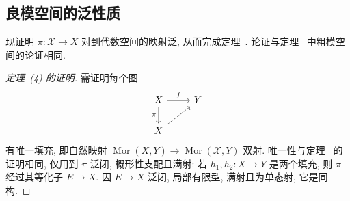 \subsection{良模空间的泛性质}\label{src:7.5.6-subsection}
现证明 $\pi:\mathcal X\to X$ 对到代数空间的映射泛, 从而完成定理~. 论证与定理~ 中粗模空间的论证相同.
\begin{proof}[定理~(4) 的证明]
需证明每个图
\begin{align}\label{src:7.5.29}
\begin{tikzcd}[ampersand replacement=\&]
\mathcal X\arrow[r,"{f}"]\arrow[d,"{\pi}"']\&Y\\
X\arrow[ur,dashed]\&
\end{tikzcd}
\end{align}
有唯一填充, 即自然映射 $\operatorname{Mor}(X,Y)\to\operatorname{Mor}(\mathcal X,Y)$ 双射. 唯一性与定理~ 的证明相同, 仅用到 $\pi$ 泛闭, 概形性支配且满射: 若 $h_1,h_2:X\to Y$ 是两个填充, 则 $\pi$ 经过其等化子 $E\to X$. 因 $E\to X$ 泛闭, 局部有限型, 满射且为单态射, 它是同构.


\end{proof}
